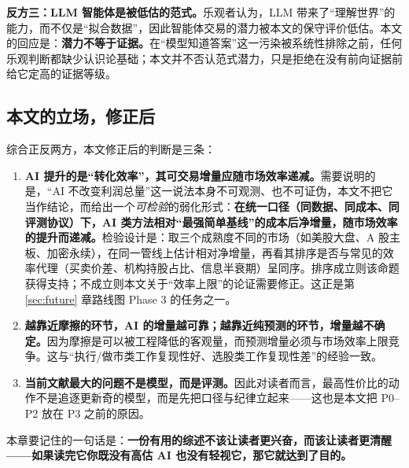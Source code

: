 \textbf{反方三：LLM 智能体是被低估的范式。}乐观者认为，LLM 带来了“理解世界”的能力，而不仅是“拟合数据”，因此智能体交易的潜力被本文的保守评价低估。本文的回应是：\textbf{潜力不等于证据。}在“模型知道答案”这一污染被系统性排除之前，任何乐观判断都缺少认识论基础；本文并不否认范式潜力，只是拒绝在没有前向证据前给它定高的证据等级。

\subsection{本文的立场，修正后}

综合正反两方，本文修正后的判断是三条：

\begin{enumerate}
  \item \textbf{AI 提升的是“转化效率”，其可交易增量应随市场效率递减。}需要说明的是，“AI 不改变利润总量”这一说法本身不可观测、也不可证伪，本文不把它当作结论，而给出一个\emph{可检验}的弱化形式：\textbf{在统一口径（同数据、同成本、同评测协议）下，AI 类方法相对“最强简单基线”的成本后净增量，随市场效率的提升而递减。}检验设计是：取三个成熟度不同的市场（如美股大盘、A 股主板、加密永续），在同一管线上估计相对净增量，再看其排序是否与常见的效率代理（买卖价差、机构持股占比、信息半衰期）呈同序。排序成立则该命题获得支持；不成立则本文关于“效率上限”的论证需要修正。这正是第 \ref{sec:future} 章路线图 Phase 3 的任务之一。
  \item \textbf{越靠近摩擦的环节，AI 的增量越可靠；越靠近纯预测的环节，增量越不确定。}因为摩擦是可以被工程降低的客观量，而预测增量必须与市场效率上限竞争。这与“执行/做市类工作复现性好、选股类工作复现性差”的经验一致。
  \item \textbf{当前文献最大的问题不是模型，而是评测。}因此对读者而言，最高性价比的动作不是追逐更新奇的模型，而是先把口径与纪律立起来——这也是本文把 P0--P2 放在 P3 之前的原因。
\end{enumerate}

本章要记住的一句话是：\textbf{一份有用的综述不该让读者更兴奋，而该让读者更清醒——如果读完它你既没有高估 AI 也没有轻视它，那它就达到了目的。}
